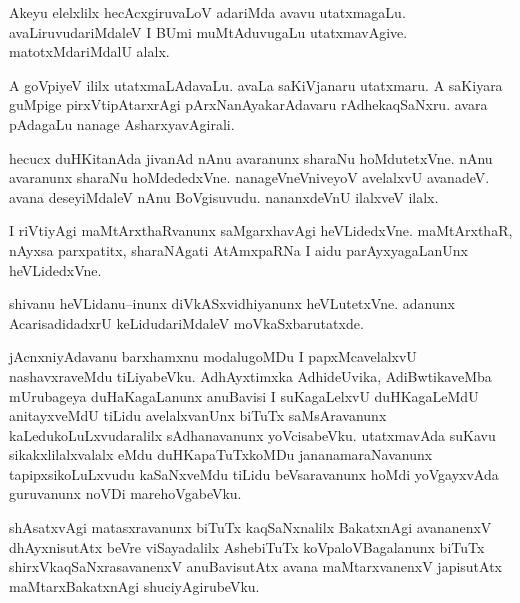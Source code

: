 \documentclass{article}
\begin{document}
\begin{mn}%
Akeyu elelxlilx hecAcxgiruvaLoV adariMda avavu utatxmagaLu. avaLiruvudariMdaleV I BUmi 
muMtAduvugaLu utatxmavAgive. matotxMdariMdalU alalx.
\end{mn}

\begin{mn}%
A goVpiyeV ililx utatxmaLAdavaLu. avaLa saKiVjanaru utatxmaru. A saKiyara guMpige 
pirxVtipAtarxrAgi pArxNanAyakarAdavaru rAdhekaqSaNxru. avara pAdagaLu nanage 
AsharxyavAgirali.
\end{mn}

\begin{mn}%
hecucx duHKitanAda jivanAd nAnu avaranunx sharaNu hoMdutetxVne. nAnu avaranunx sharaNu 
hoMdededxVne. nanageVneVniveyoV avelalxvU avanadeV. avana deseyiMdaleV nAnu BoVgisuvudu. 
nananxdeVnU ilalxveV ilalx.
\end{mn}

\begin{mn}%
I riVtiyAgi maMtArxthaRvanunx saMgarxhavAgi heVLidedxVne. maMtArxthaR, nAyxsa parxpatitx, 
sharaNAgati AtAmxpaRNa I aidu parAyxyagaLanUnx heVLidedxVne.
\end{mn}



\begin{mn}%
shivanu heVLidanu--inunx diVkASxvidhiyanunx heVLutetxVne. adanunx AcarisadidadxrU 
keLidudariMdaleV moVkaSxbarutatxde.
\end{mn}

\begin{mn}%
jAcnxniyAdavanu barxhamxnu modalugoMDu I papxMcavelalxvU nashavxraveMdu tiLiyabeVku. 
AdhAyxtimxka AdhideUvika, AdiBwtikaveMba mUrubageya duHaKagaLanunx anuBavisi I 
suKagaLelxvU duHKagaLeMdU anitayxveMdU tiLidu avelalxvanUnx biTuTx saMsAravanunx 
kaLedukoLuLxvudaralilx sAdhanavanunx yoVcisabeVku. utatxmavAda suKavu sikakxlilalxvalalx 
eMdu duHKapaTuTxkoMDu jananamaraNavanunx tapipxsikoLuLxvudu kaSaNxveMdu tiLidu 
beVsaravanunx hoMdi yoVgayxvAda guruvanunx noVDi marehoVgabeVku.
\end{mn}

\begin{mn}%
shAsatxvAgi matasxravanunx biTuTx kaqSaNxnalilx BakatxnAgi avananenxV dhAyxnisutAtx beVre 
viSayadalilx AshebiTuTx koVpaloVBagalanunx biTuTx shirxVkaqSaNxrasavanenxV anuBavisutAtx 
avana maMtarxvanenxV japisutAtx maMtarxBakatxnAgi shuciyAgirubeVku.
\end{mn}
\end{document}
